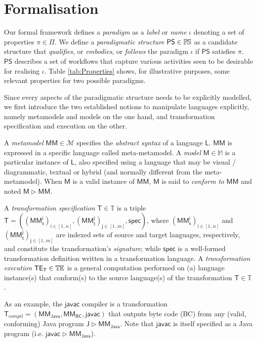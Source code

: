 \section{Formalisation}
\label{sec:Formalisation}

Our formal framework defines a \emph{paradigm} as a \emph{label} or \emph{name}
$\iota$ denoting a set of properties $\pi\in\Pi$.
We define a \emph{paradigmatic structure} $\mathsf{PS}\in \mathbb{P}\mskip-1mu\mathbb{S}$ as a candidate
structure that \emph{qualifies}, or \emph{embodies}, or \emph{follows} the
paradigm $\iota$ if $\mathsf{PS}$ satisfies $\pi$.
$\mathsf{PS}$ describes a set of workflows that capture various activities seen
to be desirable for realising $\iota$. Table \ref{tab:Properties} shows, for 
illustrative purposes, some relevant properties for two possible paradigms.

Since every aspects of the paradigmatic structure needs to be explicitly
modelled, we first introduce the two established notions to manipulate languages
explicitly, namely metamodels and models on the one hand, and transformation
specification and execution on the other.

A \emph{metamodel} $\mathsf{MM} \in \mathcal{M}$ specifies the \emph{abstract 
syntax} of a language $\mathsf{L}$. $\mathsf{MM}$ is expressed in a specific 
language called meta-metamodel. 
A \emph{model} $\mathsf{M} \in \mathbb{M}$ is a particular instance of 
$\mathsf{L}$, also specified using a language that may be visual / 
diagrammatic, textual or hybrid (and normally different from the 
meta-metamodel). When $\mathsf{M}$ is a valid instance of 
$\mathsf{MM}$, $\mathsf{M}$ is said to \emph{conform to} $\mathsf{MM}$ and noted 
$\mathsf{M} \rhd \mathsf{MM}$. 

A \emph{transformation specification} $\mathsf{T}\in\mathbb{T}$ is a triple 
$\mathsf{T} = ((\mathsf{MM_s^{i}})_{\mathsf{i}\in [1..n]}, 
(\mathsf{MM_t^{j}})_{\mathsf{j}\in[1..m]}, \mathsf{spec})$, where  
$(\mathsf{MM_s^{i}})_{\mathsf{i}\in [1..n]}$ and
$(\mathsf{MM_t^{j}})_{\mathsf{j}\in [1..m]}$ are indexed sets of source and
target languages, respectively, and constitute the transformation's 
\emph{signature}; while $\mathsf{spec}$ is a well-formed 
transformation definition written in a transformation language. A 
\emph{transformation execution} $\mathsf{TE_{T}}\in\mathbb{T}\mskip-1mu\mathbb{E}$ is a general 
computation performed on (a) language instance(s) that conform(s) to the 
source language(s) of the transformation $\mathsf{T}\in\mathbb{T}$.

As an example, the $\mathsf{javac}$ compiler is a transformation
$\mathsf{T}_{compil} = (\mathsf{MM_{Java}}, \mathsf{MM_{BC}}, \mathsf{javac})$
that outputs byte code (BC) from any (valid, conforming) Java program
$\mathsf{J}  \rhd \mathsf{MM_{Java}}$.
Note that $\mathsf{javac}$ is itself specified as a Java program (i.e.
$\mathsf{javac} \rhd \mathsf{MM_{Java}}$).

